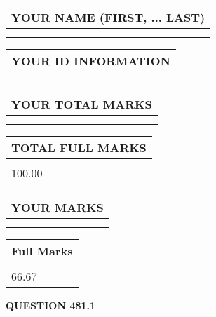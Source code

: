 \documentclass{ctexart}
\begin{document}
   
   
   
\newpage 
\setcounter{page}{ 
   481001 } 
   
   
   
   
\noindent\begin{tabular}{|l|}
\hline
YOUR NAME (FIRST, ... LAST)  \\
\hline
 \\ 
 \\ 
\hline
\end{tabular}
\hspace{0.05in} \begin{tabular}{|l|}
\hline
 YOUR   ID   INFORMATION  \\
\hline
 \\ 
 \\ 
\hline
\end{tabular}
   
   
\vspace{0.2in}\noindent\begin{tabular}{|l|}
\hline
YOUR TOTAL MARKS  \\
\hline
 \\ 
 \\ 
\hline
\end{tabular}
\hspace{0.05in} \begin{tabular}{|l|}
\hline
TOTAL FULL MARKS  \\
\hline
 \\ 
100.00 \\
\hline
\end{tabular}
   
   
 \vspace{0.2in}
 
 
 
 
   
   
  
\vspace{0.2in}
  
\noindent\begin{tabular}{|l|}
\hline
 YOUR MARKS  \\
\hline
 \\ 
 \\ 
\hline
\end{tabular}
\hspace{0.05in} \begin{tabular}{|l|}
\hline
 Full Marks  \\
\hline
 \\ 
66.67 \\
\hline
\end{tabular}
{\textbf{\Large{QUESTION
481.1 
}}}
  
\end{document}
